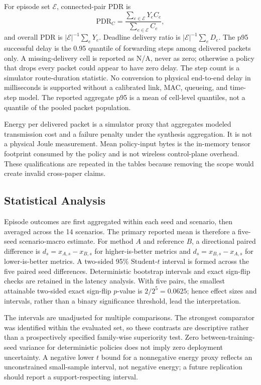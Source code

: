 \documentclass{ieeeaccess}
\newcommand{\pdr}{\mathrm{PDR}}
\begin{document}
For episode set $\mathcal E$, connected-pair PDR is
\begin{equation}
\pdr_C=\frac{\sum_{e\in\mathcal E}Y_e C_e}{\sum_{e\in\mathcal E}C_e},
\end{equation}
and overall PDR is $|\mathcal E|^{-1}\sum_e Y_e$. Deadline delivery ratio is $|\mathcal E|^{-1}\sum_e D_e$. The p95 successful delay is the 0.95 quantile of forwarding steps among delivered packets only. A missing-delivery cell is reported as N/A, never as zero; otherwise a policy that drops every packet could appear to have zero delay. The step count is a simulator route-duration statistic. No conversion to physical end-to-end delay in milliseconds is supported without a calibrated link, MAC, queueing, and time-step model. The reported aggregate p95 is a mean of cell-level quantiles, not a quantile of the pooled packet population.

Energy per delivered packet is a simulator proxy that aggregates modeled transmission cost and a failure penalty under the synthesis aggregation. It is not a physical Joule measurement. Mean policy-input bytes is the in-memory tensor footprint consumed by the policy and is not wireless control-plane overhead. These qualifications are repeated in the tables because removing the scope would create invalid cross-paper claims.

\subsection{Statistical Analysis}

Episode outcomes are first aggregated within each seed and scenario, then averaged across the 14 scenarios. The primary reported mean is therefore a five-seed scenario-macro estimate. For method $A$ and reference $B$, a directional paired difference is $d_s=x_{A,s}-x_{B,s}$ for higher-is-better metrics and $d_s=x_{B,s}-x_{A,s}$ for lower-is-better metrics. A two-sided 95\% Student-$t$ interval is formed across the five paired seed differences. Deterministic bootstrap intervals and exact sign-flip checks are retained in the latency analysis. With five pairs, the smallest attainable two-sided exact sign-flip $p$-value is $2/2^5=0.0625$; hence effect sizes and intervals, rather than a binary significance threshold, lead the interpretation.

The intervals are unadjusted for multiple comparisons. The strongest comparator was identified within the evaluated set, so these contrasts are descriptive rather than a prospectively specified family-wise superiority test. Zero between-training-seed variance for deterministic policies does not imply zero deployment uncertainty. A negative lower $t$ bound for a nonnegative energy proxy reflects an unconstrained small-sample interval, not negative energy; a future replication should report a support-respecting interval.
\end{document}
